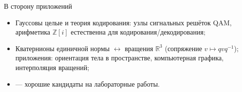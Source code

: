 \documentclass[serif, aspectratio=169]{beamer}
\begin{document}
\begin{frame}{В сторону приложений}
    \begin{itemize}
        \item Гауссовы целые и теория кодирования: узлы сигнальных решёток QAM, арифметика $\mathbb{Z}[i]$ естественна для кодирования/декодирования;
        \item Кватернионы единичной нормы $\leftrightarrow$ вращения $\mathbb{R}^3$ (сопряжение $v\mapsto qvq^{-1}$); приложения: ориентация тела в пространстве, компьютерная графика, интерполяция вращений;
        \item --- хорошие кандидаты на лабораторные работы.
    \end{itemize}
\end{frame}
\end{document}

